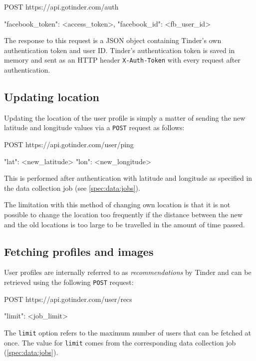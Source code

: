 \begin{logs}
POST https://api.gotinder.com/auth

{
    "facebook_token": <access_token>, 
    "facebook_id": <fb_user_id>
}
\end{logs}

The response to this request is a \ac{JSON} object containing Tinder's own 
authentication token and user ID. Tinder's authentication token is saved in 
memory and sent as an HTTP header \texttt{X-Auth-Token} with every request 
after authentication.


\subsection{Updating location}
Updating the location of the user profile is simply a matter of sending the 
new latitude and longitude values via a \texttt{POST} request as follows:
\begin{logs}
POST https://api.gotinder.com/user/ping

{
    "lat": <new_latitude>
    "lon": <new_longitude>
}
\end{logs}
This is performed after authentication with latitude and longitude as 
specified in the data collection job (see \ref{spec:data:jobs}).

The limitation with this method of changing own location is that it is not 
possible to change the location too frequently if the distance between the new 
and the old locations is too large to be travelled in the amount of time 
passed.

\subsection{Fetching profiles and images}
User profiles are internally referred to as \textit{recommendations} by Tinder and 
can be retrieved using the following \texttt{POST} request:
\begin{logs}
POST https://api.gotinder.com/user/recs

{
    "limit": <job_limit>
}
\end{logs}
The \texttt{limit} option refers to the maximum number of users that can be 
fetched at once. The value for \texttt{limit} comes from the corresponding 
data collection job (\ref{spec:data:jobs}).

